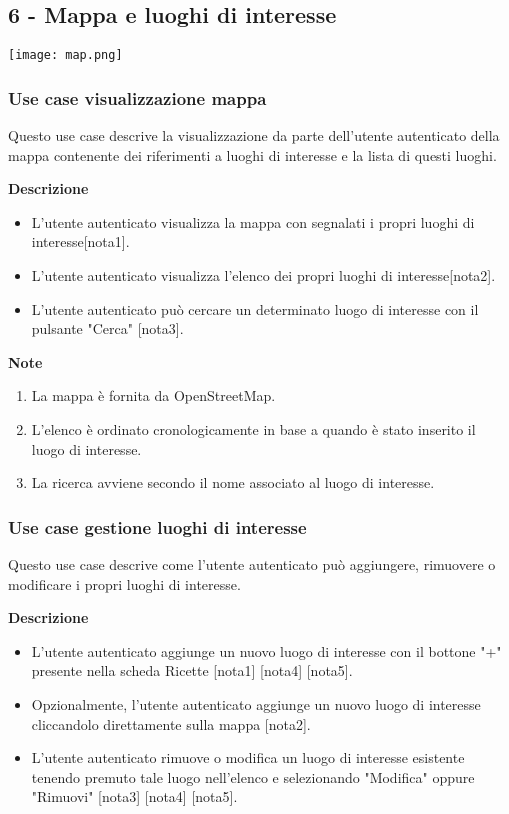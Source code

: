 \documentclass[a4paper,12pt]{article}
\begin{document}
\subsection*{6 - Mappa e luoghi di interesse }

\begin{center}
  \texttt{[image: map.png]}
\end{center}



\subsubsection*{Use case visualizzazione mappa}

Questo use case descrive la visualizzazione da parte dell'utente autenticato della mappa contenente dei riferimenti a luoghi di interesse e la lista di questi luoghi.

\textbf{Descrizione}
\begin{itemize} \setlength\itemsep{0.01em}
\item L'utente autenticato visualizza la mappa con segnalati i propri luoghi di interesse[nota1].
\item L'utente autenticato visualizza l'elenco dei propri luoghi di interesse[nota2].
\item L'utente autenticato può cercare un determinato luogo di interesse con il pulsante "Cerca" [nota3].
\end{itemize}

\textbf{Note}
\begin{enumerate} \setlength\itemsep{0.01em}
\item La mappa è fornita da OpenStreetMap.
\item L'elenco è ordinato cronologicamente in base a quando è stato inserito il luogo di interesse.
\item La ricerca avviene secondo il nome associato al luogo di interesse.
\end{enumerate}




\subsubsection*{Use case gestione luoghi di interesse}

Questo use case descrive come l'utente autenticato può aggiungere, rimuovere o modificare i propri luoghi di interesse.

\textbf{Descrizione}
\begin{itemize} \setlength\itemsep{0.01em}
\item L'utente autenticato aggiunge un nuovo luogo di interesse con il bottone "+" presente nella scheda Ricette [nota1] [nota4] [nota5].
\item Opzionalmente, l'utente autenticato aggiunge un nuovo luogo di interesse cliccandolo direttamente sulla mappa [nota2].
\item L'utente autenticato rimuove o modifica un luogo di interesse esistente tenendo premuto tale luogo nell'elenco e selezionando "Modifica" oppure "Rimuovi" [nota3] [nota4] [nota5].
\end{itemize}
\end{document}
